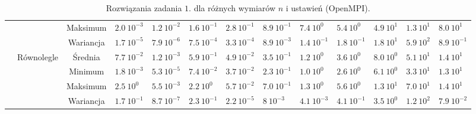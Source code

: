 \documentclass[11pt, a4paper, oneside]{article}
\begin{document}
\begin{table}[t]
\begin{adjustwidth}{-1.76cm}{}
\begin{tabular}{|c|c|c|l|l|l|l|l|l|l|l|l|l|}
                      &                               & Maksimum  & $2.0 \ 10^{-3}$          & $1.2 \ 10^{-2}$         & $1.6 \ 10^{-1}$          & $2.8  \ 10^{-1}$        & $8.9 \ 10^{-1}$          & $7.4 \ 10^{0}$          & $5.4 \ 10^{0}$           & $4.9 \ 10^{1}$          & $1.3 \ 10^{1}$           & $8.0 \ 10^{1}$          \\ \cline{3-13} 
                      &                               & Wariancja & $1.7 \ 10^{-5}$          & $7.9 \ 10^{-6}$         & $7.5 \ 10^{-4}$          & $3.3 \ 10^{-4}$         & $8.9 \ 10^{-3}$          & $1.4 \ 10^{-1}$         & $1.8 \ 10^{-1}$          & $1.8 \ 10^{1}$          & $5.9 \ 10^{2}$           & $8.9 \ 10^{-1}$         \\ \cline{2-13} 
                      & \multirow{4}{*}{Równolegle}   & Średnia   & $7.7 \ 10^{-2}$          & $1.2 \ 10^{-3}$         & $5.9 \ 10^{-1}$          & $4.9 \ 10^{-2}$         & $3.5 \ 10^{-1}$          & $1.2 \ 10^{0}$          & $3.6 \ 10^{0}$           & $8.0 \ 10^{0}$          & $5.1 \ 10^{1}$           & $1.4 \ 10^{1}$          \\ \cline{3-13} 
                      &                               & Minimum   & $1.8 \ 10^{-3}$          & $5.3 \ 10^{-5}$         & $7.4 \ 10^{-2}$          & $3.7 \ 10^{-2}$         & $2.3 \ 10^{-1}$          & $1.0 \ 10^{0}$          & $2.6 \ 10^{0}$           & $6.1 \ 10^{0}$          & $3.3 \ 10^{1}$           & $1.3 \ 10^{1}$          \\ \cline{3-13} 
                      &                               & Maksimum  & $2.5 \ 10^{0}$           & $5.5 \ 10^{-3}$         & $2.2 \ 10^{0}$           & $5.7 \ 10^{-2}$         & $7.0 \ 10^{-1}$          & $1.3 \ 10^{0}$          & $5.6 \ 10^{0}$           & $1.3 \ 10^{1}$          & $7.0 \ 10^{1}$           & $1.4 \ 10^{1}$          \\ \cline{3-13} 
                      &                               & Wariancja & $1.7 \ 10^{-1}$          & $8.7 \ 10^{-7}$         & $2.3 \ 10^{-1}$          & $2.2 \ 10^{-5}$         & $8 \ 10^{-3}$            & $4.1 \ 10^{-3}$         & $4.1 \ 10^{-1}$          & $3.5 \ 10^{0}$          & $1.2 \ 10^{2}$           & $7.9 \ 10^{-2}$         \\ \hline
\end{tabular}
\end{adjustwidth}
\caption{Rozwiązania zadania $1$. dla różnych wymiarów $n$ i ustawień (OpenMPI).}
\label{tab:MPI:zad_1}
\end{table}
\end{document}
